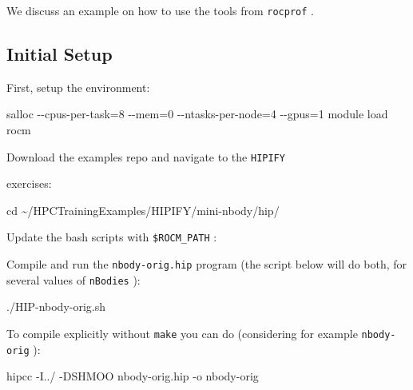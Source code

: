 \documentclass[
]{article}
\let\oldtexttt\texttt
\renewcommand{\texttt}[1]{
  \colorbox{Light}{\oldtexttt{#1}}
}
\newenvironment{Shaded}{}{}
\newcommand{\BuiltInTok}[1]{#1}
\newcommand{\ExtensionTok}[1]{#1}
\newcommand{\FunctionTok}[1]{\textcolor[rgb]{0.02,0.16,0.49}{#1}}
\newcommand{\NormalTok}[1]{#1}
\newcommand{\StringTok}[1]{\textcolor[rgb]{0.25,0.44,0.63}{#1}}
\begin{document}
We discuss an example on how to use the tools from \texttt{rocprof}.

\hypertarget{initial-setup}{%
\subsection{Initial Setup}\label{initial-setup}}

First, setup the environment:

\begin{Shaded}
\begin{Highlighting}[]
\ExtensionTok{salloc}\NormalTok{ {-}{-}cpus{-}per{-}task=8 {-}{-}mem=0 {-}{-}ntasks{-}per{-}node=4 {-}{-}gpus=1}
\ExtensionTok{module}\NormalTok{ load rocm}
\end{Highlighting}
\end{Shaded}

Download the examples repo and navigate to the \texttt{HIPIFY}
exercises:

\begin{Shaded}
\begin{Highlighting}[]
\BuiltInTok{cd}\NormalTok{ \textasciitilde{}/HPCTrainingExamples/HIPIFY/mini{-}nbody/hip/}
\end{Highlighting}
\end{Shaded}

Update the bash scripts with \texttt{\$ROCM\_PATH}:

\begin{Shaded}
\end{Shaded}

Compile and run the \texttt{nbody-orig.hip} program (the script below
will do both, for several values of \texttt{nBodies}):

\begin{Shaded}
\begin{Highlighting}[]
\ExtensionTok{./HIP{-}nbody{-}orig.sh}
\end{Highlighting}
\end{Shaded}

To compile explicitly without \texttt{make} you can do (considering for
example \texttt{nbody-orig}):

\begin{Shaded}
\begin{Highlighting}[]
\ExtensionTok{hipcc}\NormalTok{ {-}I../ {-}DSHMOO nbody{-}orig.hip {-}o nbody{-}orig}
\end{Highlighting}
\end{Shaded}
\end{document}
